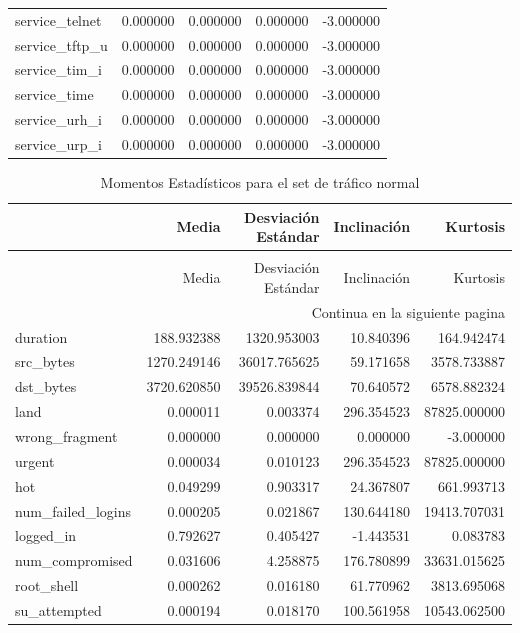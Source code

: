 \documentclass[12pt,a4paper]{article}
\begin{document}
\begin{longtable}{lrrrr}
  service_telnet & 0.000000 & 0.000000 & 0.000000 & -3.000000 \\
  service_tftp_u & 0.000000 & 0.000000 & 0.000000 & -3.000000 \\
  service_tim_i & 0.000000 & 0.000000 & 0.000000 & -3.000000 \\
  service_time & 0.000000 & 0.000000 & 0.000000 & -3.000000 \\
  service_urh_i & 0.000000 & 0.000000 & 0.000000 & -3.000000 \\
  service_urp_i & 0.000000 & 0.000000 & 0.000000 & -3.000000 \\
\end{longtable}

\begin{longtable}{lrrrr}
  \caption{Momentos Estadísticos para el set de tráfico normal} \\
  \toprule
  & Media & Desviación Estándar & Inclinación & Kurtosis \\
  \midrule
  \endfirsthead
  \caption[]{Momentos Estadísticos para el set de tráfico normal} \\
  \toprule
  & Media & Desviación Estándar & Inclinación & Kurtosis \\
  \midrule
  \endhead
  \midrule
  \multicolumn{5}{r}{Continua en la siguiente pagina} \\
  \midrule
  \endfoot
  \bottomrule
  \endlastfoot
  duration & 188.932388 & 1320.953003 & 10.840396 & 164.942474 \\
  src_bytes & 1270.249146 & 36017.765625 & 59.171658 & 3578.733887 \\
  dst_bytes & 3720.620850 & 39526.839844 & 70.640572 & 6578.882324 \\
  land & 0.000011 & 0.003374 & 296.354523 & 87825.000000 \\
  wrong_fragment & 0.000000 & 0.000000 & 0.000000 & -3.000000 \\
  urgent & 0.000034 & 0.010123 & 296.354523 & 87825.000000 \\
  hot & 0.049299 & 0.903317 & 24.367807 & 661.993713 \\
  num_failed_logins & 0.000205 & 0.021867 & 130.644180 & 19413.707031 \\
  logged_in & 0.792627 & 0.405427 & -1.443531 & 0.083783 \\
  num_compromised & 0.031606 & 4.258875 & 176.780899 & 33631.015625 \\
  root_shell & 0.000262 & 0.016180 & 61.770962 & 3813.695068 \\
  su_attempted & 0.000194 & 0.018170 & 100.561958 & 10543.062500 \\

\end{longtable}
\end{document}
